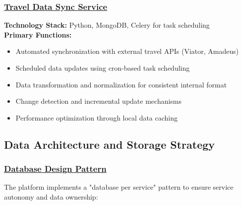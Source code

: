 \subsubsection*{\underline{Travel Data Sync Service}}
\textbf{Technology Stack:} Python, MongoDB, Celery for task scheduling\\
\textbf{Primary Functions:}
\begin{itemize}
    \item Automated synchronization with external travel APIs (Viator, Amadeus)
    \item Scheduled data updates using cron-based task scheduling
    \item Data transformation and normalization for consistent internal format
    \item Change detection and incremental update mechanisms
    \item Performance optimization through local data caching
\end{itemize}

\subsection{Data Architecture and Storage Strategy}

\subsubsection*{\underline{Database Design Pattern}}
The platform implements a "database per service" pattern to ensure service autonomy and data ownership:

